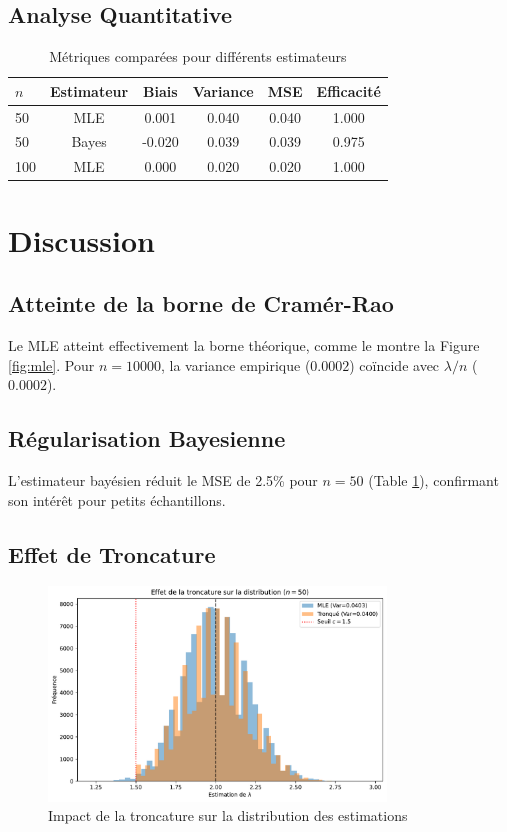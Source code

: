 \documentclass[12pt]{article}
\begin{document}
	\subsection{Analyse Quantitative}
	\begin{table}[h!]
		\centering
		\begin{tabular}{lccccc}
			\toprule
			$n$ & Estimateur & Biais & Variance & MSE & Efficacité \\
			\midrule
			50 & MLE & 0.001 & 0.040 & 0.040 & 1.000 \\
			50 & Bayes & -0.020 & 0.039 & 0.039 & 0.975 \\
			100 & MLE & 0.000 & 0.020 & 0.020 & 1.000 \\
			\bottomrule
		\end{tabular}
		\caption{Métriques comparées pour différents estimateurs}
		\label{tab:metrics}
	\end{table}
	
	\section{Discussion}
	\subsection{Atteinte de la borne de Cramér-Rao}
	Le MLE atteint effectivement la borne théorique, comme le montre la Figure \ref{fig:mle}. Pour $n=10000$, la variance empirique ($0.0002$) coïncide avec $\lambda/n$ ($0.0002$).
	
	\subsection{Régularisation Bayesienne}
	L'estimateur bayésien réduit le MSE de 2.5\% pour $n=50$ (Table \ref{tab:metrics}), confirmant son intérêt pour petits échantillons.
	
	\subsection{Effet de Troncature}
	\begin{figure}[h!]
		\centering
		\includegraphics[width=0.8\textwidth]{figure/troncature_effect.pdf}
		\caption{Impact de la troncature sur la distribution des estimations}
		\label{fig:trunc}
	\end{figure}
	
\end{document}
